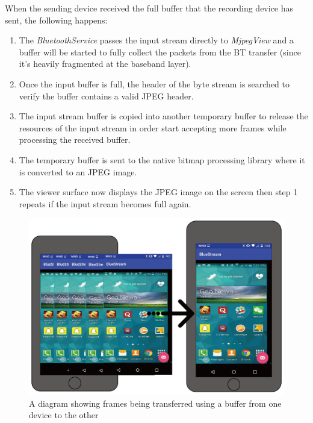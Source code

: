 \documentclass[a4paper,12pt]{article}
\begin{document}
When the sending device received the full buffer that the recording device has sent, the following happens:

\begin{enumerate}
\item The \textit{BluetoothService} passes the input stream directly to \textit{MjpegView} and a buffer will be started to fully collect the packets from the BT transfer (since it’s heavily fragmented at the baseband layer). 
\item Once the input buffer is full, the header of the byte stream is searched to verify the buffer contains a valid JPEG header. 
\item The input stream buffer is copied into another temporary buffer to release the resources of the input stream in order start accepting more frames while processing the received buffer. 
\item The temporary buffer is sent to the native bitmap processing library where it is converted to an JPEG image.
\item The viewer surface now displays the JPEG image on the screen then step 1 repeats if the input stream becomes full again.
\end{enumerate}

\begin{figure}[h!]
\centering
\includegraphics[scale=.5]{Figures/Figure8.png}
\caption{A diagram showing frames being transferred using a buffer from one device to the other}
\label{fig:FrameSeperation}
\end{figure}
\end{document}
